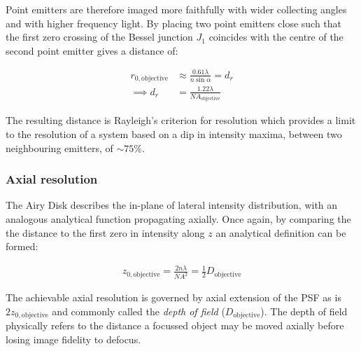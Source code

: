 Point emitters are therefore imaged more faithfully with wider collecting angles and with higher frequency light.
By placing two point emitters close such that the first zero crossing of the Bessel junction $J_1$ coincides with the centre of the second point emitter gives a distance of:

\begin{align}
    r_{0,\text{objective}} &\approx \frac{0.61\lambda}{n\sin\alpha} = d_r \label{eq:lateral_res}\\
    \implies d_r &= \frac{1.22 \lambda}{NA_{\text{objective}}}
\end{align}

The resulting distance is Rayleigh's criterion for resolution which provides a limit to the resolution of a system based on a dip in intensity maxima, between two neighbouring emitters, of $\sim 75\%$.

\subsubsection{Axial resolution}

The Airy Disk describes the in-plane of lateral intensity distribution, with an analogous analytical function propagating axially.
Once again, by comparing the the distance to the first zero in intensity along $z$ an analytical definition can be formed:

\begin{align}
    z_{0,\text{objective}} = \frac{2n\lambda}{{NA}^2} \label{eq:axial_res} = \frac{1}{2} D_{\text{objective}}
\end{align}

The achievable axial resolution is governed by axial extension of the PSF as is $2z_{0,\text{objective}}$ and commonly called the \emph{depth of field} ($D_{\text{objective}}$).
The depth of field physically refers to the distance a focussed object may be moved axially before losing image fidelity to defocus.

